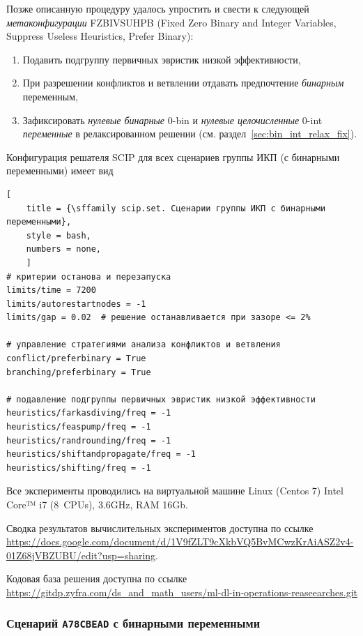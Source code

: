 \documentclass[%
	11pt,
	a4paper,
	utf8,
		]{article}
\begin{document}
Позже описанную процедуру удалось упростить и свести к следующей \emph{метаконфигурации} {FZBIVSUHPB} (Fixed Zero Binary and Integer Variables, Suppress Useless Heuristics, Prefer Binary):
\begin{enumerate}
	\item Подавить подгруппу первичных эвристик низкой эффективности,
	
	\item При разрешении конфликтов и ветвлении отдавать предпочтение \emph{бинарным} переменным,
	
	\item Зафиксировать \emph{нулевые бинарные} 0-bin и \emph{нулевые целочисленные} 0-int  \emph{переменные} в релаксированном решении (см. раздел~\ref{sec:bin_int_relax_fix}).
\end{enumerate}

Конфигурация решателя SCIP для всех сценариев группы ИКП (с бинарными переменными) имеет вид
\begin{lstlisting}[
	title = {\sffamily scip.set. Сценарии группы ИКП с бинарными переменными},
	style = bash,
	numbers = none,
	]
# критерии останова и перезапуска
limits/time = 7200
limits/autorestartnodes = -1
limits/gap = 0.02  # решение останавливается при зазоре <= 2%

# управление стратегиями анализа конфликтов и ветвления
conflict/preferbinary = True
branching/preferbinary = True

# подавление подгруппы первичных эвристик низкой эффективности
heuristics/farkasdiving/freq = -1
heuristics/feaspump/freq = -1
heuristics/randrounding/freq = -1
heuristics/shiftandpropagate/freq = -1
heuristics/shifting/freq = -1
\end{lstlisting}

Все эксперименты проводились на виртуальной машине Linux (Centos 7) Intel Core™ i7 (8~CPUs), 3.6GHz, RAM 16Gb.

Сводка результатов вычислительных экспериментов доступна по ссылке \url{https://docs.google.com/document/d/1V9fZLT9cXkbVQ5BvMCwzKrAiASZ2v4-01Z68jVBZUBU/edit?usp=sharing}.

Кодовая база решения доступна по ссылке \url{https://gitdp.zyfra.com/ds_and_math_users/ml-dl-in-operations-reaseearches.git}

\subsubsection{Сценарий \texttt{A78CBEAD} с бинарными переменными}
\end{document}
